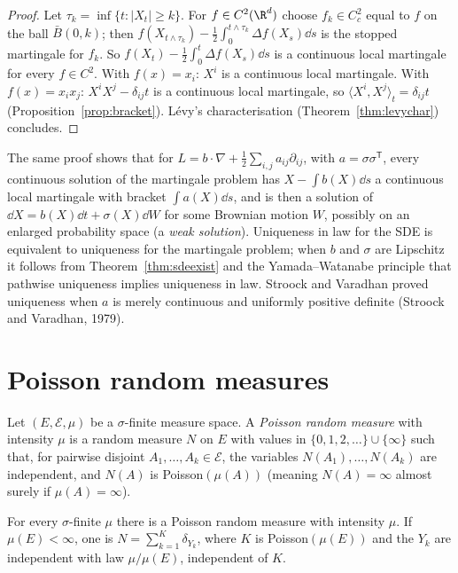\begin{proof}
Let $\tau_k=\inf\{t:|X_t|\ge k\}$. For $f\in C^2(\R^d)$ choose $f_k\in C^2_c$ equal to $f$ on the ball $\bar B(0,k)$; then $f(X_{t\wedge\tau_k})-\frac12\int_0^{t\wedge\tau_k}\Delta f(X_s)\dd s$ is the stopped martingale for $f_k$. So
$f(X_t)-\frac12\int_0^t\Delta f(X_s)\dd s$ is a continuous local martingale for every $f\in C^2$. With $f(x)=x_i$: $X^i$ is a continuous local martingale. With $f(x)=x_ix_j$: $X^iX^j-\delta_{ij}t$ is a continuous local
martingale, so $\langle X^i,X^j\rangle_t=\delta_{ij}t$ (Proposition~\ref{prop:bracket}). L\'evy's characterisation (Theorem~\ref{thm:levychar}) concludes.
\end{proof}

\begin{remark}
The same proof shows that for $L=b\cdot\nabla+\frac12\sum_{i,j}a_{ij}\partial_{ij}$, with $a=\sigma\sigma^{\mathsf T}$, every continuous solution of the martingale problem has $X-\int b(X)\dd s$ a continuous local martingale with bracket
$\int a(X)\dd s$, and is then a solution of $\dd X=b(X)\dd t+\sigma(X)\dd W$ for some Brownian motion $W$, possibly on an enlarged probability space (a \emph{weak solution}). Uniqueness in law for the SDE is
equivalent to uniqueness for the martingale problem; when $b$ and $\sigma$ are Lipschitz it follows from Theorem~\ref{thm:sdeexist} and the Yamada--Watanabe principle that pathwise uniqueness implies uniqueness in law. Stroock and Varadhan proved
uniqueness when $a$ is merely continuous and uniformly positive definite (Stroock and Varadhan, 1979).
\end{remark}

\section{Poisson random measures}

\begin{definition}\label{def:prm}
Let $(E,\mathcal E,\mu)$ be a $\sigma$-finite measure space. A \emph{Poisson random measure} with intensity $\mu$ is a random measure $N$ on $E$ with values in $\{0,1,2,\dots\}\cup\{\infty\}$ such that, for pairwise disjoint
$A_1,\dots,A_k\in\mathcal E$, the variables $N(A_1),\dots,N(A_k)$ are independent, and $N(A)$ is Poisson$(\mu(A))$ (meaning $N(A)=\infty$ almost surely if $\mu(A)=\infty$).
\end{definition}

\begin{theorem}\label{thm:prmexist}
For every $\sigma$-finite $\mu$ there is a Poisson random measure with intensity $\mu$. If $\mu(E)<\infty$, one is $N=\sum_{k=1}^K\delta_{Y_k}$, where $K$ is Poisson$(\mu(E))$ and the $Y_k$ are independent with law
$\mu/\mu(E)$, independent of $K$.
\end{theorem}

